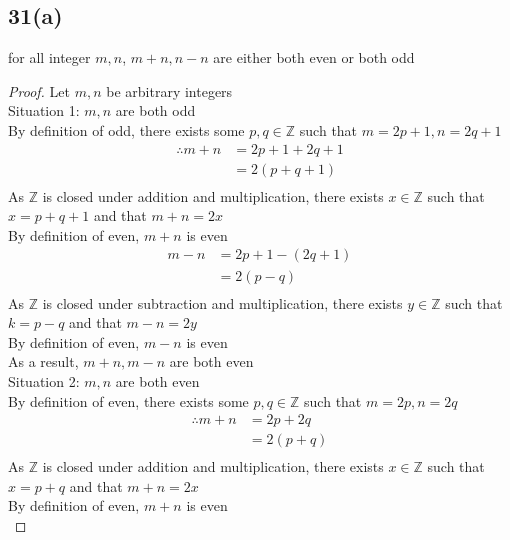\documentclass{article}
\begin{document}
\subsection{31(a)}
for all integer $m,n$, $m+n, n-n$ are either both even or both odd
\begin{proof}
    Let $m,n$ be arbitrary integers\\
    Situation 1: $m,n$ are both odd\\
    By definition of odd, there exists some $p,q \in \mathbb{Z}$ such that $m = 2p +1, n = 2q + 1$\\
    \begin{align*}
        \therefore
        m + n &= 2p+1 + 2q + 1 \tag{By substitution}\\
        &= 2(p+q+1) \tag{By algebra}\\
    \end{align*}
    As $\mathbb{Z}$  is closed under addition and multiplication, there exists $x \in \mathbb{Z}$ such that $x = p+q+1$ and that $m + n = 2x$\\
    By definition of even, $m + n$ is even\\
    
     \begin{align*}
        m - n &= 2p+1 - (2q + 1) \tag{By substitution}\\
        &= 2(p-q) \tag{By algebra}\\
    \end{align*}
    As $\mathbb{Z}$  is closed under subtraction and multiplication, there exists $y \in \mathbb{Z}$ such that $k = p-q$ and that $m - n = 2y$\\
    By definition of even, $m - n$ is even\\
    As a result, $m+n,m-n$ are both even\\

    Situation 2: $m,n$ are both even\\
    By definition of even, there exists some $p,q \in \mathbb{Z}$ such that $m = 2p, n = 2q$\\
    \begin{align*}
        \therefore
        m + n &= 2p + 2q \tag{By substitution}\\
        &= 2(p+q) \tag{By algebra}\\
    \end{align*}
    As $\mathbb{Z}$  is closed under addition and multiplication, there exists $x \in \mathbb{Z}$ such that $x = p+q$ and that $m + n = 2x$\\
    By definition of even, $m + n$ is even\\
    

\end{proof}
\end{document}
